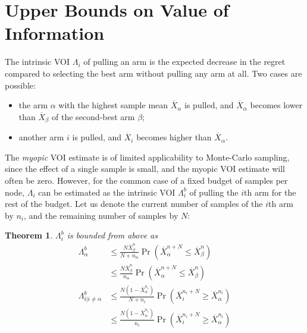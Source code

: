 \documentclass[]{article}
\newtheorem{thm}{Theorem}
\begin{document}
\section{Upper Bounds on Value of Information}

The intrinsic VOI $\Lambda_i$ of pulling an arm is the expected decrease
in the regret compared to selecting the best arm without pulling any arm at
all. Two cases are possible:
\begin{itemize}
\item the arm $\alpha$ with the highest sample mean $\overline
  X_\alpha$ is pulled, and $\overline X_\alpha$ becomes lower than
  $\overline X_\beta$ of the second-best arm $\beta$;
\item another arm $i$ is pulled, and $\overline X_i$ becomes higher
than $\overline X_\alpha$.
\end{itemize}
The \textit{myopic} VOI estimate is of limited applicability to
Monte-Carlo sampling, since the effect of a single sample is small,
and the myopic VOI estimate will often be zero. However, for the
common case of a fixed budget of samples per node, $\Lambda_i$ can be
estimated as the intrinsic VOI $\Lambda_i^b$ of pulling the $i$th arm
for the rest of the budget.  Let us denote the current number of
samples of the $i$th arm by $n_i$, and the remaining number of samples
by $N$:
\begin{thm} $\Lambda_i^b$ is bounded from above as
\begin{align}
\label{eqn:thm-be}
  \Lambda_\alpha^b& \le \frac {N \overline X_\beta^n} {N+n_\alpha}\Pr(\overline X_\alpha^{n+N}\le\overline X_\beta^n)\nonumber\\
    &\le \frac {N \overline X_\beta^n} {n_\alpha} \Pr(\overline X_\alpha^{n+N}\le\overline X_\beta^n)\nonumber\\
\Lambda_{i|i\ne\alpha}^b& \le \frac{ N(1-\overline  X_\alpha^{n_i})} {N+n_i}\Pr(\overline X_i^{{n_i}+N}\ge\overline X_\alpha^{n_i})\nonumber\\
     &\le \frac {N(1-\overline X_\alpha^{n_i})} {n_i}\Pr(\overline   X_i^{{n_i}+N}\ge\overline X_\alpha^{n_i})
\end{align}
\label{thm:be}
\end{thm}
\end{document}
